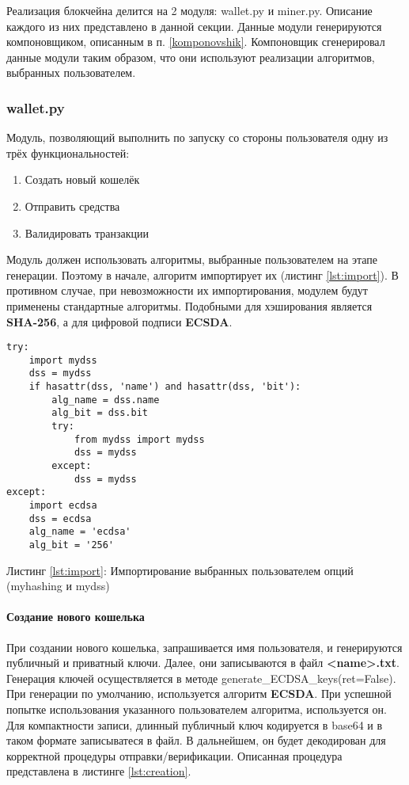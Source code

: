 Реализация блокчейна делится на 2 модуля: {\small wallet.py} и {\small
miner.py}. Описание каждого из них представлено в данной секции.
Данные модули генерируются компоновщиком, описанным в п. \ref{komponovshik}.
Компоновщик сгенерировал данные модули таким образом, что они используют
реализации алгоритмов, выбранных пользователем.

\subsubsection{wallet.py}
Модуль, позволяющий выполнить по запуску со стороны пользователя одну из трёх
функциональностей:

\begin{enumerate}
    \item Создать новый кошелёк
    \item Отправить средства
    \item Валидировать транзакции
\end{enumerate}


Модуль должен использовать алгоритмы, выбранные пользователем на этапе
генерации. Поэтому в начале, алгоритм импортирует их (листинг
\ref{lst:import}). В противном случае, при невозможности их импортирования,
модулем будут применены стандартные алгоритмы.  Подобными для хэширования
является \textbf{SHA-256}, а для цифровой подписи \textbf{ECSDA}. 

\begin{center}
\begin{lstlisting}
try:
    import mydss
    dss = mydss
    if hasattr(dss, 'name') and hasattr(dss, 'bit'):
        alg_name = dss.name
        alg_bit = dss.bit
        try:
            from mydss import mydss
            dss = mydss
        except:
            dss = mydss
except:
    import ecdsa
    dss = ecdsa
    alg_name = 'ecdsa'
    alg_bit = '256'
\end{lstlisting}\label{lst:import}
    Листинг \ref{lst:import}: Импортирование выбранных пользователем опций (myhashing и mydss)
\end{center}

\paragraph{Создание нового кошелька}
При создании нового кошелька, запрашивается имя пользователя, и генерируются
публичный и приватный ключи. Далее, они записываются в файл
\textbf{<name>.txt}.  Генерация ключей осуществляется в методе {\small
generate\_ECDSA\_keys(ret=False)}.  При генерации по умолчанию, используется
алгоритм \textbf{ECSDA}. При успешной попытке использования указанного
пользователем алгоритма, используется он. Для компактности записи, длинный
публичный ключ кодируется в base64 и в таком формате записыватеся в файл. В
дальнейшем, он будет декодирован для корректной процедуры отправки/верификации.
Описанная процедура представлена в листинге \ref{lst:creation}.

